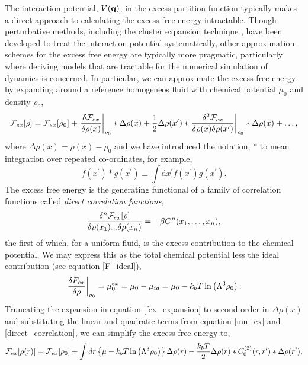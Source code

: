 The interaction potential, $V(\mathbf{q})$, in the excess partition function typically
makes a direct approach to calculating the excess free energy intractable.
Though perturbative methods, including the cluster expansion technique
\cite{MAYER41}, have been developed to treat the interaction potential
systematically, other approximation schemes for the excess free energy are
typically more pragmatic, particularly where deriving models that are tractable
for the numerical simulation of dynamics is concerned.  In particular, we can
approximate the excess free energy by expanding around a reference homogeneos
fluid with chemical potential $\mu_0$ and density $\rho_0$,
%
\begin{equation}
    \label{fex_expansion}
    \mathcal{F}_{ex}[\rho] = \mathcal{F}_{ex}[\rho_0]
        + \left . \frac{\delta \mathcal{F}_{ex}}{\delta\rho(x)} \right\vert_{\rho_0} \ast \Delta\rho(x) 
        + \frac{1}{2} \Delta\rho(x^\prime) \ast
            \left . \frac{\delta^2 \mathcal{F}_{ex}}{\delta\rho(x)\delta\rho(x^\prime)}
            \right\vert_{\rho_0} \ast \Delta\rho(x) 
        + \dots,
\end{equation}
%
where $\Delta\rho(x) = \rho(x) - \rho_0$ and we have introduced the notation,
$\ast$ to mean integration over repeated co-ordinates, for example,
%
\begin{equation}
    f(x^\prime) \ast g(x^\prime)
        \equiv \int\mathrm{d}x^\prime f(x^\prime) g(x^\prime).
\end{equation}
%
The excess free energy is the generating functional of a family of correlation
functions called \textit{direct correlation functions}, 
%
\begin{equation}
    \label{direct_correlation}
    \frac{\delta^n \mathcal{F}_{ex}[\rho]}{\delta \rho(x_1) ... \delta \rho(x_n)}
        = -\beta C^{n}(x_1, \dots, x_n),
\end{equation}
%
the first of which, for a uniform fluid, is the excess contribution to the
chemical potential. We may express  this as the total chemical potential less
the ideal contribution (see equation \ref{F_ideal}), 
%
\begin{equation}
    \label{mu_ex}
    \left.\frac{\delta F_{ex}}{\delta \rho}\right\vert_{\rho_0}
        = \mu_0^{ex}
        = \mu_0 - \mu_{id} 
        = \mu_0 - k_bT\ln\left(\Lambda^3 \rho_0\right).
\end{equation}
%
Truncating the expansion in equation \ref{fex_expansion} to second order in
$\Delta\rho(x)$ and substituting the linear and quadratic terms from  equation
\ref{mu_ex} and \ref{direct_correlation}, we can simplify the excess free
energy to,
%
\begin{equation}
    \label{F_ex}
    \mathcal{F}_{ex}[\rho(r)] = \mathcal{F}_{ex}[\rho_0] 
        + \int dr 
            \left\lbrace\mu - k_bT \ln\left(\Lambda^3 \rho_0 \right)
            \right\rbrace \Delta\rho(r)
        - \frac{k_b T}{2} \Delta\rho(r) \ast C^{(2)}_0(r, r^\prime) 
            \ast \Delta\rho(r^\prime),
\end{equation}
